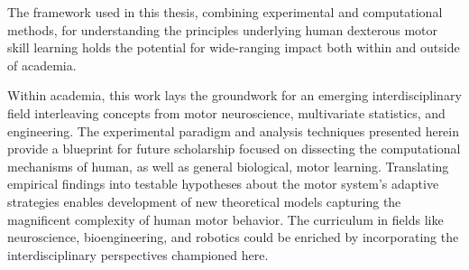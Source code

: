 \begin{impactstatement}





The framework used in this thesis, combining experimental and computational methods, for understanding the principles underlying human dexterous motor skill learning holds the potential for wide-ranging impact both within and outside of academia.

Within academia, this work lays the groundwork for an emerging interdisciplinary field interleaving concepts from motor neuroscience, multivariate statistics, and engineering. The experimental paradigm and analysis techniques presented herein provide a blueprint for future scholarship focused on dissecting the computational mechanisms of human, as well as general biological, motor learning. Translating empirical findings into testable hypotheses about the motor system's adaptive strategies enables development of new theoretical models capturing the magnificent complexity of human motor behavior. The curriculum in fields like neuroscience, bioengineering, and robotics could be enriched by incorporating the interdisciplinary perspectives championed here.


\end{impactstatement}

